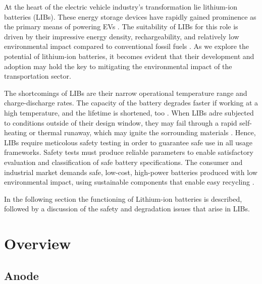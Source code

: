 
At the heart of the electric vehicle industry's transformation lie lithium-ion batteries (LIBs). These energy storage devices have rapidly gained prominence as the primary means of powering EVs \cite{zubi2018lithium,stampatori2020li}. The suitability of LIBs for this role is driven by their impressive energy density, rechargeability, and relatively low environmental impact compared to conventional fossil fuels \cite{korthauer2018lithium}. As we explore the potential of lithium-ion batteries, it becomes evident that their development and adoption may hold the key to mitigating the environmental impact of the transportation sector. 

The shortcomings of LIBs are their narrow operational temperature range and charge-discharge rates. The capacity of the battery degrades faster if working at a high temperature, and the lifetime is shortened, too \cite{ma2018temperature,ning2003capacity}. When LIBs adre subjected to conditions outside of their design window, they may fail through a rapid self-heating or thermal runaway, which may ignite the sorrounding materials \cite{palacin2016batteries}. 
Hence, LIBs require meticolous safety testing in order to guarantee safe use in all usage frameworks. Safety tests must produce reliable parameters to enable satisfactory evaluation and classification of safe battery specifications. The consumer and industrial market demands safe, low-cost, high-power batteries produced with low environmental impact, using sustainable components that enable easy recycling \cite{doughty2012general}.

In the following section the functioning of Lithium-ion batteries is described, followed by a discussion of the safety and degradation issues that arise in LIBs.

\section{Overview}
\label{sec:overview}
\cite{korthauer2018lithium,goodenough2013li}
\subsection{Anode}
\label{sec:anode}

